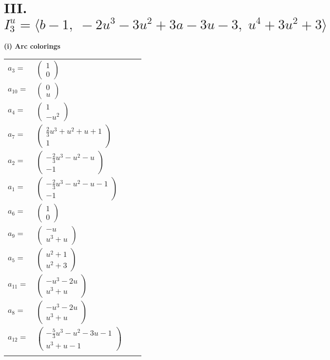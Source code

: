 \documentclass[1p]{elsarticle_modified}
\theoremstyle{definition}
\begin{document}
\centering \section*{III. $I^u_{3}= \langle b-1,\;-2 u^3-3 u^2+3 a-3 u-3,\;u^4+3 u^2+3 \rangle$}
\flushleft \textbf{(i) Arc colorings}\\
\begin{tabular}{m{7pt} m{180pt} m{7pt} m{180pt} }
\flushright $a_{3}=$&$\begin{pmatrix}1\\0\end{pmatrix}$ \\
\flushright $a_{10}=$&$\begin{pmatrix}0\\u\end{pmatrix}$ \\
\flushright $a_{4}=$&$\begin{pmatrix}1\\- u^2\end{pmatrix}$ \\
\flushright $a_{7}=$&$\begin{pmatrix}\frac{2}{3} u^3+u^2+u+1\\1\end{pmatrix}$ \\
\flushright $a_{2}=$&$\begin{pmatrix}-\frac{2}{3} u^3- u^2- u\\-1\end{pmatrix}$ \\
\flushright $a_{1}=$&$\begin{pmatrix}-\frac{2}{3} u^3- u^2- u-1\\-1\end{pmatrix}$ \\
\flushright $a_{6}=$&$\begin{pmatrix}1\\0\end{pmatrix}$ \\
\flushright $a_{9}=$&$\begin{pmatrix}- u\\u^3+u\end{pmatrix}$ \\
\flushright $a_{5}=$&$\begin{pmatrix}u^2+1\\u^2+3\end{pmatrix}$ \\
\flushright $a_{11}=$&$\begin{pmatrix}- u^3-2 u\\u^3+u\end{pmatrix}$ \\
\flushright $a_{8}=$&$\begin{pmatrix}- u^3-2 u\\u^3+u\end{pmatrix}$ \\
\flushright $a_{12}=$&$\begin{pmatrix}-\frac{5}{3} u^3- u^2-3 u-1\\u^3+u-1\end{pmatrix}$\\&\end{tabular}
\end{document}
